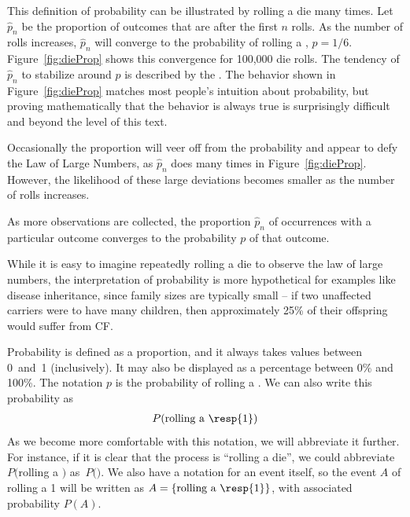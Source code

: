 This definition of probability can be illustrated by rolling a die many times. Let $\hat{p}_n$ be the proportion of outcomes that are  after the first $n$ rolls. As the number of rolls increases, $\hat{p}_n$ will converge to the probability of rolling a , $p = 1/6$. Figure~\ref{fig:dieProp} shows this convergence for 100,000 die rolls. The tendency of $\hat{p}_n$ to stabilize around $p$ is described by the . The behavior shown in Figure~\ref{fig:dieProp} matches most people's intuition about probability, but proving mathematically that the behavior is always true is surprisingly difficult and beyond the level of this text.

Occasionally the proportion will veer off from the probability and appear to defy the Law of Large Numbers, as $\hat{p}_n$ does many times in Figure~\ref{fig:dieProp}. However, the likelihood of these large deviations becomes smaller as the number of rolls increases.

\begin{termBox}{
As more observations are collected, the proportion $\hat{p}_n$ of occurrences with a particular outcome converges to the probability $p$ of that outcome.}
\end{termBox}


While it is easy to imagine repeatedly rolling a die to observe the law of large numbers, the interpretation of probability is more hypothetical for examples like disease inheritance, since family sizes are typically small -- if two unaffected carriers were to have many children, then approximately 25\% of their offspring would suffer from CF.

Probability is defined as a proportion, and it always takes values between 0~and~1 (inclusively). It may also be displayed as a percentage between 0\% and 100\%. The notation $p$ is the probability of rolling a . We can also write this probability as
\begin{eqnarray*}
P(\text{rolling a \resp{1}})
\end{eqnarray*}
As we become more comfortable with this notation, we will abbreviate it further. For instance, if it is clear that the process is ``rolling a die'', we could abbreviate $P($rolling a $)$ as~$P($$)$.  We also have a notation for an event itself, so the event $A$ of rolling a 1 will be written as $A = \{\text{rolling a \resp{1}}\}$, with associated probability $P(A)$. 

